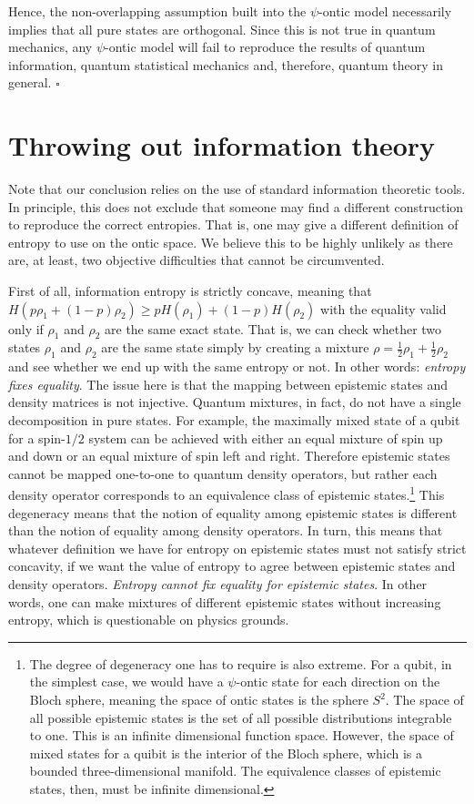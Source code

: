 \documentclass[10pt,twocolumn, nofootinbib]{revtex4-2}
\begin{document}
Hence, the non-overlapping assumption built into the $\psi$-ontic model necessarily implies that all pure states are orthogonal. Since this is not true in quantum mechanics, any $\psi$-ontic model will fail to reproduce the results of quantum information, quantum statistical mechanics and, therefore, quantum theory in general. $\square$

\section{Throwing out information theory}

Note that our conclusion relies on the use of standard information theoretic tools. In principle, this does not exclude that someone may find a different construction to reproduce the correct entropies. That is, one may give a different definition of entropy to use on the ontic space. We believe this to be highly unlikely as there are, at least, two objective difficulties that cannot be circumvented.

First of all, information entropy is strictly concave, meaning that $H(p \rho_1 + (1-p) \rho_2) \geq p H(\rho_1) + (1-p) H(\rho_2)$ with the equality valid only if $\rho_1$ and $\rho_2$ are the same exact state. That is, we can check whether two states $\rho_1$ and $\rho_2$ are the same state simply by creating a mixture $\rho = \frac{1}{2} \rho_1 + \frac{1}{2} \rho_2$ and see whether we end up with the same entropy or not. In other words: \emph{entropy fixes equality}.
The issue here is that the mapping between epistemic states and density matrices is not injective. Quantum mixtures, in fact, do not have a single decomposition in pure states. For example, the maximally mixed state of a qubit for a spin-$1/2$ system can be achieved with either an equal mixture of spin up and down or an equal mixture of spin left and right. Therefore epistemic states cannot be mapped one-to-one to quantum density operators, but rather each density operator corresponds to an equivalence class of epistemic states.\footnote{The degree of degeneracy one has to require is also extreme. For a qubit, in the simplest case, we would have a $\psi$-ontic state for each direction on the Bloch sphere, meaning the space of ontic states is the sphere $S^2$. The space of all possible epistemic states is the set of all possible distributions integrable to one. This is an infinite dimensional function space. However, the space of mixed states for a quibit is the interior of the Bloch sphere, which is a bounded three-dimensional manifold. The equivalence classes of epistemic states, then, must be infinite dimensional.} This degeneracy means that the notion of equality among epistemic states is different than the notion of equality among density operators. In turn, this means that whatever definition we have for entropy on epistemic states must not satisfy strict concavity, if we want the value of entropy to agree between epistemic states and density operators. \emph{Entropy cannot fix equality for epistemic states}. In other words, one can make mixtures of different epistemic states without increasing entropy, which is questionable on physics grounds.
\end{document}
